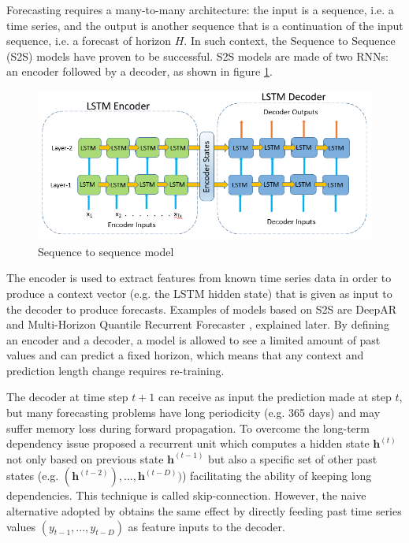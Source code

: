 \documentclass[a4paper]{article} %
\begin{document}
	Forecasting requires a many-to-many architecture: the input is a sequence, i.e. a time series, and the output is another sequence that is a continuation of the input sequence, i.e. a forecast of horizon $H$. In such context, the Sequence to Sequence (S2S) \cite{seq2seq} models have proven to be successful. S2S models are made of two RNNs: an encoder followed by a decoder, as shown in figure \ref{fig:seq2seq}.
	\begin{figure}
		\includegraphics[width=\linewidth]{img/seq2seq.png}
		\caption{Sequence to sequence model}
		\label{fig:seq2seq}
	\end{figure}
	 The encoder is used to extract features from known time series data in order to produce a context vector (e.g. the LSTM hidden state) that is given as input to the decoder to produce forecasts. Examples of models based on S2S are DeepAR \cite{DeepAR} and Multi-Horizon Quantile Recurrent Forecaster \cite{MQCNN}, explained later. By defining an encoder and a decoder, a model is allowed to see a limited amount of past values and can predict a fixed horizon, which means that any context and prediction length change requires re-training. 
	 
	 The decoder at time step $t+1$ can receive as input the prediction made at step $t$, but many forecasting problems have long periodicity (e.g. 365 days) and may suffer memory loss during forward propagation. To overcome the long-term dependency issue \cite{NARX} proposed a recurrent unit which computes a hidden state $\pmb{h}^{(t)}$ not only based on previous state $\pmb{h}^{(t-1)}$ but also a specific set of other past states (e.g. $(\pmb{h}^{(t-2)}), ..., \pmb{h}^{(t-D)})$) facilitating the ability of keeping long dependencies. This technique is called skip-connection. However, the naive alternative adopted by \cite{DeepAR, MQCNN} obtains the same effect by directly feeding past time series values $(y_{t-1}, ..., y_{t-D})$ as feature inputs to the decoder.
	
\end{document}
